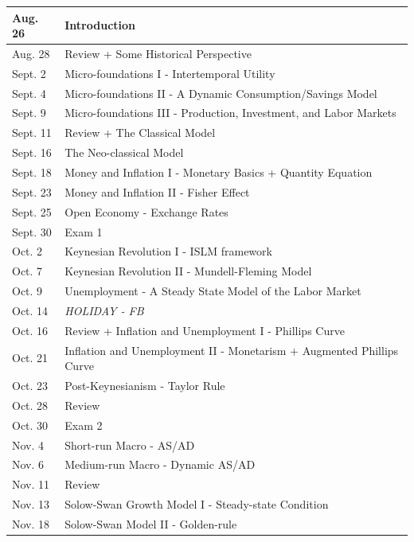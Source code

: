 \documentclass[11pt]{article}
\begin{document}
	{
		
		\begin{tabular}{|l|l|}
			\hline
			Aug. 26 & Introduction\\
			\hline
			Aug. 28 & Review + Some Historical Perspective\\
			\hline
			Sept. 2 & Micro-foundations I - Intertemporal Utility \\
			\hline
			Sept. 4 & Micro-foundations II - A Dynamic Consumption/Savings Model \\ 
			\hline
			Sept. 9 & Micro-foundations III - Production, Investment, and Labor Markets \\
			\hline
			Sept. 11 & Review + The Classical Model\\
			\hline
			Sept. 16 & The Neo-classical Model\\
			\hline
			Sept. 18 & Money and Inflation I - Monetary Basics + Quantity Equation \\
			\hline
			Sept. 23 & Money and Inflation II - Fisher Effect \\
			\hline
			Sept. 25 & Open Economy - Exchange Rates\\
			\hline
			Sept. 30 & Exam 1 \\
			\hline
			Oct. 2& Keynesian Revolution I - ISLM framework \\
			\hline
			Oct. 7 & Keynesian Revolution II - Mundell-Fleming Model\\
			\hline
			Oct. 9 & Unemployment - A Steady State Model of the Labor Market\\
			\hline
			Oct. 14 & \textit{HOLIDAY - FB}\\
			\hline
			Oct. 16 & Review + Inflation and Unemployment I - Phillips Curve \\
			\hline
			Oct. 21 & Inflation and Unemployment II - Monetarism + Augmented Phillips Curve\\
			\hline
			Oct. 23 & Post-Keynesianism - Taylor Rule \\
			\hline
			Oct. 28 & Review \\
			\hline
			Oct. 30 & Exam 2 \\
			\hline
			Nov. 4 & Short-run Macro - AS/AD \\
			\hline
			Nov. 6 & Medium-run Macro - Dynamic AS/AD \\
			\hline
			Nov. 11 & Review\\
			\hline
			Nov. 13 & Solow-Swan Growth Model I - Steady-state Condition\\
			\hline
			Nov. 18 & Solow-Swan Model II - Golden-rule\\

\end{tabular}}
\end{document}
